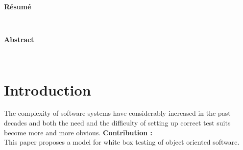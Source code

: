\documentclass[a4paper]{report}
\begin{document}
\thispagestyle{empty}
\begin{center}
\normalbaselineskip
{\bf\Large \TitreRapport}\\[8mm]
{\bf\large \NomsAuteurs}\\[1mm]
{\Labo}\\[4mm]
\DateRapport\\[4mm]
\Encadrants\\[10mm]

\newpage
{\bf R\'esum\'e}
\end{center}


\ResumeFrancais\\[4mm]
\newline
\begin{center}
{\bf Abstract}
\end{center}
\Abstract\\[4mm]

\newpage


\tableofcontents

\renewcommand{\thesection}{\arabic{section}}

\newtheorem{theorem}{Theorem}
\newtheorem{lemma}{Lemme}

\renewcommand{\thetheorem}{\empty{}}
\renewcommand{\thelemma}{\empty{}} 

\newenvironment{proof}[1][Proof]{\begin{trivlist}
\item[\hskip \labelsep {\bfseries #1}]}{\end{trivlist}}
\newenvironment{definition}[1][Definition]{\begin{trivlist}
\item[\hskip \labelsep {\bfseries #1}]}{\end{trivlist}}
\newenvironment{example}[1][Example]{\begin{trivlist}
\item[\hskip \labelsep {\bfseries #1}]}{\end{trivlist}}
\newenvironment{remark}[1][Rq:]{\begin{trivlist}
\item[\hskip \labelsep {\bfseries #1}]}{\end{trivlist}}
\newenvironment{rappel}[1][rappel:]{\begin{trivlist}
\item[\hskip \labelsep {\bfseries #1}]}{\end{trivlist}}


\chapter*{Introduction}
The complexity of software systems have considerably increased in the past decades and both the need and the difficulty of setting up correct test suits become more and more obvious.
\newline
\textbf{Contribution :}\\
This paper proposes a model for white box testing of object oriented software.
\end{document}
